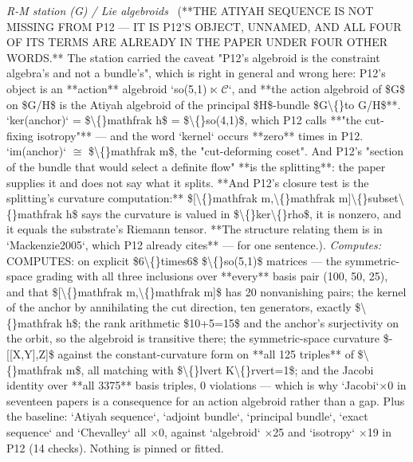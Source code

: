 \begin{description}
\textit{R-M station (G) / Lie algebroids} \ (**THE ATIYAH SEQUENCE IS NOT MISSING FROM P12 --- IT IS P12'S OBJECT, UNNAMED, AND ALL FOUR OF ITS TERMS ARE ALREADY IN THE PAPER UNDER FOUR OTHER WORDS.** The station carried the caveat "P12's algebroid is the constraint algebra's and not a bundle's", which is right in general and wrong here: P12's object is an **action** algebroid `so(5,1) \ensuremath{\ltimes} \ensuremath{\mathcal{C}}`, and **the action algebroid of \$G\$ on \$G/H\$ is the Atiyah algebroid of the principal \$H\$-bundle \$G\textbackslash\{\}to G/H\$**. `ker(anchor)` = \$\textbackslash\{\}mathfrak h\$ = \$\textbackslash\{\}so(4,1)\$, which P12 calls **"the cut-fixing isotropy"** --- and the word `kernel` occurs **zero** times in P12. `im(anchor)` \ensuremath{\cong} \$\textbackslash\{\}mathfrak m\$, the "cut-deforming coset". And P12's "section of the bundle that would select a definite flow" **is the splitting**: the paper supplies it and does not say what it splits. **And P12's closure test is the splitting's curvature computation:** \$[\textbackslash\{\}mathfrak m,\textbackslash\{\}mathfrak m]\textbackslash\{\}subset\textbackslash\{\}mathfrak h\$ says the curvature is valued in \$\textbackslash\{\}ker\textbackslash\{\}rho\$, it is nonzero, and it equals the substrate's Riemann tensor. **The structure relating them is in `Mackenzie2005`, which P12 already cites** --- for one sentence.). 
\emph{Computes:} COMPUTES: on explicit \$6\textbackslash\{\}times6\$ \$\textbackslash\{\}so(5,1)\$ matrices --- the symmetric-space grading with all three inclusions over **every** basis pair (100, 50, 25), and that \$[\textbackslash\{\}mathfrak m,\textbackslash\{\}mathfrak m]\$ has 20 nonvanishing pairs; the kernel of the anchor by annihilating the cut direction, ten generators, exactly \$\textbackslash\{\}mathfrak h\$; the rank arithmetic \$10+5=15\$ and the anchor's surjectivity on the orbit, so the algebroid is transitive there; the symmetric-space curvature \$-[[X,Y],Z]\$ against the constant-curvature form on **all 125 triples** of \$\textbackslash\{\}mathfrak m\$, all matching with \$\textbackslash\{\}lvert K\textbackslash\{\}rvert=1\$; and the Jacobi identity over **all 3375** basis triples, 0 violations --- which is why `Jacobi`\ensuremath{\times}0 in seventeen papers is a consequence for an action algebroid rather than a gap. Plus the baseline: `Atiyah sequence`, `adjoint bundle`, `principal bundle`, `exact sequence` and `Chevalley` all \ensuremath{\times}0, against `algebroid` \ensuremath{\times}25 and `isotropy` \ensuremath{\times}19 in P12 (14 checks). Nothing is pinned or fitted.

\end{description}
